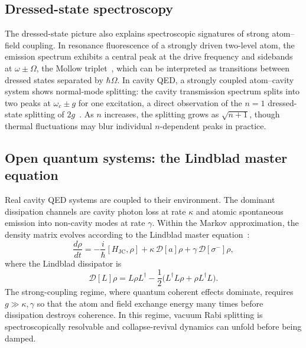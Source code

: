 \documentclass[12pt]{iopart}
\begin{document}
\subsection{Dressed-state spectroscopy}
\label{sec:dressed_spectroscopy}

The dressed-state picture also explains spectroscopic signatures of strong atom--field coupling. In resonance fluorescence of a strongly driven two-level atom, the emission spectrum exhibits a central peak at the drive frequency and sidebands at $\omega \pm \Omega$, the Mollow triplet~\cite{mollow1969}, which can be interpreted as transitions between dressed states separated by $\hbar\Omega$. In cavity QED, a strongly coupled atom--cavity system shows normal-mode splitting: the cavity transmission spectrum splits into two peaks at $\omega_c \pm g$ for one excitation, a direct observation of the $n = 1$ dressed-state splitting of $2g$~\cite{thompson1992}. As $n$ increases, the splitting grows as $\sqrt{n+1}$, though thermal fluctuations may blur individual $n$-dependent peaks in practice.


\subsection{Open quantum systems: the Lindblad master equation}
\label{sec:lindblad}

Real cavity QED systems are coupled to their environment. The dominant dissipation channels are cavity photon loss at rate $\kappa$ and atomic spontaneous emission into non-cavity modes at rate $\gamma$. Within the Markov approximation, the density matrix evolves according to the Lindblad master equation~\cite{lindblad1976, wiseman2009}:
\begin{equation}
\frac{d\rho}{dt} = -\frac{i}{\hbar}[H_{\text{JC}}, \rho] + \kappa\, \mathcal{D}[a]\rho + \gamma\, \mathcal{D}[\sigma^-]\rho,
\label{eq:lindblad}
\end{equation}
where the Lindblad dissipator is
\begin{equation}
\mathcal{D}[L]\rho = L\rho L^\dagger - \frac{1}{2}\big(L^\dagger L \rho + \rho L^\dagger L\big).
\label{eq:dissipator}
\end{equation}
The strong-coupling regime, where quantum coherent effects dominate, requires $g \gg \kappa, \gamma$ so that the atom and field exchange energy many times before dissipation destroys coherence. In this regime, vacuum Rabi splitting is spectroscopically resolvable and collapse-revival dynamics can unfold before being damped.
\end{document}
